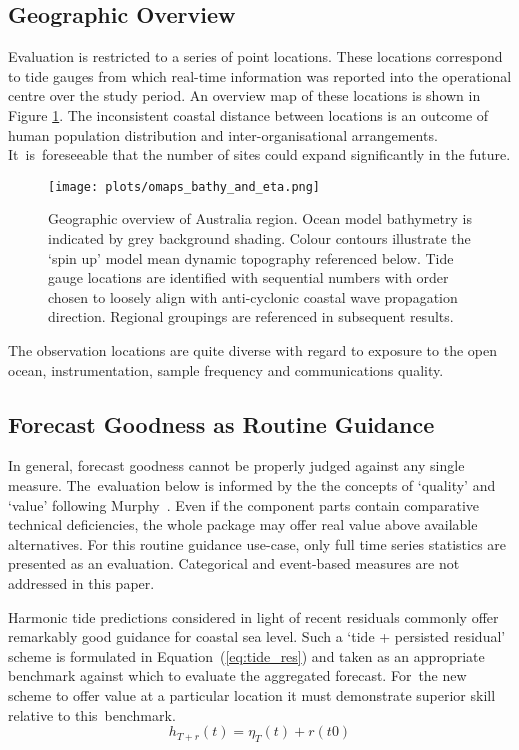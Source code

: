 \subsection{Geographic Overview}
Evaluation is restricted to a series of point locations.  These locations correspond to tide gauges from which real-time information was reported into the operational centre over the study period.  An overview map of these locations is shown in Figure \ref{fig:map_locations}.
The inconsistent coastal distance between locations is an outcome of human population distribution and inter-organisational arrangements.
It~is~foreseeable that the number of sites could expand significantly in the future.
\vspace{6pt}
\begin{figure}[H]
    \centering
    \texttt{[image: plots/omaps\_bathy\_and\_eta.png]}
    \caption{Geographic overview of Australia region.  Ocean model bathymetry is indicated by grey background shading.  Colour contours illustrate the `spin up' model mean dynamic topography referenced below.  Tide gauge locations are identified with sequential numbers with order chosen to loosely align with anti-cyclonic coastal wave propagation direction. Regional groupings are referenced in subsequent results.}
    \label{fig:map_locations}
\end{figure}  

The observation locations are quite diverse with regard to exposure to the open ocean, instrumentation, sample frequency and communications quality. 


\subsection{Forecast Goodness as Routine Guidance}
In general, forecast goodness cannot be properly judged against any single measure.
The~evaluation below is informed by the the concepts of `quality' and `value' following Murphy~\cite{Murphy:1993dh}.
Even if the component parts contain comparative technical deficiencies, the whole package may offer real value above available alternatives.
For this routine guidance use-case, only full time series statistics are presented as an evaluation. 
Categorical and event-based measures are not addressed in this paper.


Harmonic tide predictions considered in light of recent residuals commonly offer remarkably good guidance for coastal sea level.
Such a `tide + persisted residual' scheme is formulated in Equation~(\ref{eq:tide_res}) and taken as an appropriate benchmark against which to evaluate the aggregated forecast.
For~the new scheme to offer value at a particular location it must demonstrate superior skill relative to this~benchmark.  
\begin{equation}
h_{T+r}(t) = \eta_{T}(t) + r(t0)
\label{eq:tide_res}
\end{equation}


